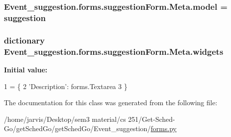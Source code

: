 \subsubsection[{\texorpdfstring{model}{model}}]{\setlength{\rightskip}{0pt plus 5cm}Event\+\_\+suggestion.\+forms.\+suggestion\+Form.\+Meta.\+model = suggestion\hspace{0.3cm}{\ttfamily [static]}}\hypertarget{classEvent__suggestion_1_1forms_1_1suggestionForm_1_1Meta_a00d6e6fbe0c15704a844c5d3058a9d14}{}\label{classEvent__suggestion_1_1forms_1_1suggestionForm_1_1Meta_a00d6e6fbe0c15704a844c5d3058a9d14}
\subsubsection[{\texorpdfstring{widgets}{widgets}}]{\setlength{\rightskip}{0pt plus 5cm}dictionary Event\+\_\+suggestion.\+forms.\+suggestion\+Form.\+Meta.\+widgets\hspace{0.3cm}{\ttfamily [static]}}\hypertarget{classEvent__suggestion_1_1forms_1_1suggestionForm_1_1Meta_ab9d5ea068fbe2a4de4871b1dc9b3a7e9}{}\label{classEvent__suggestion_1_1forms_1_1suggestionForm_1_1Meta_ab9d5ea068fbe2a4de4871b1dc9b3a7e9}
{\bfseries Initial value\+:}
\begin{DoxyCode}
1 = \{
2                 \textcolor{stringliteral}{'Description'}: forms.Textarea
3             \}
\end{DoxyCode}


The documentation for this class was generated from the following file\+:\begin{DoxyCompactItemize}
\item 
/home/jarvis/\+Desktop/sem3 material/cs 251/\+Get-\/\+Sched-\/\+Go/get\+Sched\+Go/get\+Sched\+Go/\+Event\+\_\+suggestion/\hyperlink{Event__suggestion_2forms_8py}{forms.\+py}\end{DoxyCompactItemize}
